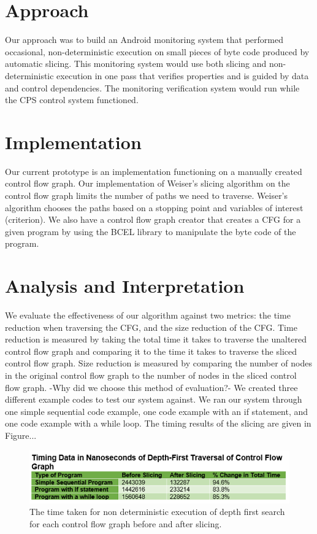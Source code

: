 \documentclass[peerreview]{IEEEtran}
\begin{document}
\section{Approach} \label{sec:criteria}
Our approach was to build an Android monitoring system that performed occasional, non-deterministic execution on small pieces of byte code produced by automatic slicing. This monitoring system would use both slicing and non-deterministic execution in one pass that verifies properties and is guided by data and control dependencies. The monitoring verification system would run while the CPS control system functioned.  



\section{Implementation}
Our current prototype is an implementation functioning on a manually created control flow graph. Our implementation of Weiser’s slicing algorithm on the control flow graph limits the number of paths we need to traverse. Weiser’s algorithm chooses the paths based on a stopping point and variables of interest (criterion). We also have a control flow graph creator that creates a CFG for a given program by using the BCEL library to manipulate the byte code of the program.  


\section{Analysis and Interpretation}

	We evaluate the effectiveness of our algorithm against two metrics: the time reduction when traversing the CFG, and the size reduction of the CFG. Time reduction is measured by taking the total time it takes to traverse the unaltered control flow graph and comparing it to the time it takes to traverse the sliced control flow graph. Size reduction is measured by comparing the number of nodes in the original control flow graph to the number of nodes in the sliced control flow graph. -Why did we choose this method of evaluation?-
	We created three different example codes to test our system against. We ran our system through one simple sequential code example, one code example with an if statement, and one code example with a while loop. The timing results of the slicing are given in Figure...



\begin{figure}[!h]
\centering
\includegraphics[width=0.8\columnwidth]{SlicingTimes} 
\caption{The time taken for non deterministic execution of depth first search for each control flow graph before and after slicing.}
\label{fig_sim}
\end{figure}
\end{document}
